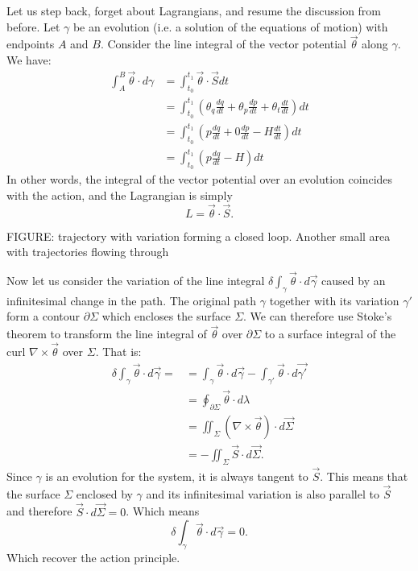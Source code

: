 \documentclass[10pt,twocolumn, nofootinbib]{revtex4-2}
\begin{document}
Let us step back, forget about Lagrangians, and resume the discussion from before. Let $\gamma$ be an evolution (i.e. a solution of the equations of motion) with endpoints $A$ and $B$. Consider the line integral of the vector potential $\vec{\theta}$ along $\gamma$. We have:
\begin{equation}
\begin{aligned}
	\int_A^B \vec{\theta} \cdot d\gamma &= \int^{t_1}_{t_0} \vec{\theta} \cdot \vec{S} dt \\
	&= \int^{t_1}_{t_0} \left(\theta_q \frac{dq}{dt} + \theta_p \frac{dp}{dt} + \theta_t \frac{dt}{dt}\right) dt \\
	&= \int^{t_1}_{t_0} \left(p \frac{dq}{dt} + 0 \frac{dp}{dt} - H \frac{dt}{dt}\right) dt \\
	&= \int^{t_1}_{t_0} \left(p \frac{dq}{dt} - H\right) dt
\end{aligned}
\end{equation}
In other words, the integral of the vector potential over an evolution coincides with the action, and the Lagrangian is simply
\begin{equation}
	L = \vec{\theta} \cdot \vec{S}.
\end{equation}

FIGURE: trajectory with variation forming a closed loop. Another small area with trajectories flowing through

Now let us consider the variation of the line integral $\delta \int_{\gamma} \vec{\theta} \cdot d\vec{\gamma}$ caused by an infinitesimal change in the path. The original path $\gamma$ together with its variation $\gamma'$ form a contour $\partial \Sigma$ which encloses the surface $\Sigma$. We can therefore use Stoke's theorem to transform the line integral of $\vec{\theta}$ over $\partial \Sigma$ to a surface integral of the curl $\nabla \times \vec{\theta}$ over $\Sigma$. That is:
\begin{align*}
	\delta \int_{\gamma} \vec{\theta} \cdot d\vec{\gamma} = 
	&= \int_{\gamma} \vec{\theta} \cdot d\vec{\gamma} - \int_{\gamma'} \vec{\theta} \cdot d\vec{\gamma'} \\
	&= \oint_{\partial \Sigma} \vec{\theta}  \cdot d\lambda \\
	&= \iint_{\Sigma} \left( \nabla \times \vec{\theta} \right) \cdot d\vec{\Sigma} \\
	&= - \iint_{\Sigma} \vec{S} \cdot d\vec{\Sigma}.
\end{align*}
Since $\gamma$ is an evolution for the system, it is always tangent to $\vec{S}$. This means that the surface $\Sigma$ enclosed by $\gamma$ and its infinitesimal variation is also parallel to $\vec{S}$ and therefore $\vec{S} \cdot d\vec{\Sigma} = 0$. Which means
\begin{equation}
	\delta \int_{\gamma} \vec{\theta} \cdot d\vec{\gamma} = 0.
\end{equation}
Which recover the action principle.
\end{document}
